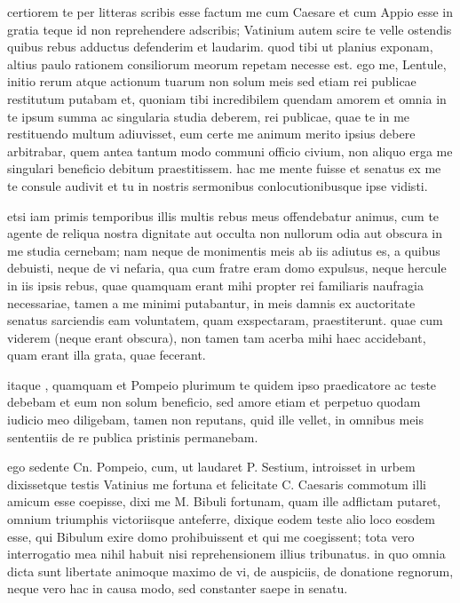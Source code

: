 certiorem te per litteras scribis esse factum me cum Caesare et cum Appio esse in gratia teque id non reprehendere adscribis; Vatinium autem scire te velle ostendis quibus rebus adductus defenderim et laudarim. quod tibi ut planius exponam, altius paulo rationem consiliorum meorum repetam necesse est. ego me, Lentule, initio rerum atque actionum tuarum non solum meis sed etiam rei publicae restitutum putabam et, quoniam tibi incredibilem quendam amorem et omnia in te ipsum summa ac singularia studia deberem, rei publicae, quae te in me restituendo multum adiuvisset, eum certe me animum merito ipsius debere arbitrabar, quem antea tantum modo communi officio civium, non aliquo erga me singulari beneficio debitum praestitissem. hac me mente fuisse et senatus ex me te consule audivit et tu in nostris sermonibus conlocutionibusque ipse vidisti.

 etsi iam primis temporibus illis multis rebus meus offendebatur animus, cum te agente de reliqua nostra dignitate aut occulta non nullorum odia aut obscura in me studia cernebam; nam neque de monimentis meis ab iis adiutus es, a quibus debuisti, neque de vi nefaria, qua cum fratre eram domo expulsus, neque hercule in iis ipsis rebus, quae quamquam erant mihi propter rei familiaris naufragia necessariae, tamen a me minimi putabantur, in meis damnis ex auctoritate senatus sarciendis eam voluntatem, quam exspectaram, praestiterunt. quae cum viderem (neque erant obscura), non tamen tam acerba mihi haec accidebant, quam erant illa grata, quae fecerant.

 itaque , quamquam et Pompeio plurimum te quidem ipso praedicatore ac teste debebam et eum non solum beneficio, sed amore etiam et perpetuo quodam iudicio meo diligebam, tamen non reputans, quid ille vellet, in omnibus meis sententiis de re publica pristinis permanebam.

 ego sedente Cn. Pompeio, cum, ut laudaret P. Sestium, introisset in urbem dixissetque testis Vatinius me fortuna et felicitate C. Caesaris commotum illi amicum esse coepisse, dixi me M. Bibuli fortunam, quam ille adflictam putaret, omnium triumphis victoriisque anteferre, dixique eodem teste alio loco eosdem esse, qui Bibulum exire domo prohibuissent et qui me coegissent; tota vero interrogatio mea nihil habuit nisi reprehensionem illius tribunatus. in quo omnia dicta sunt libertate animoque maximo de vi, de auspiciis, de donatione regnorum, neque vero hac in causa modo, sed constanter saepe in senatu.

